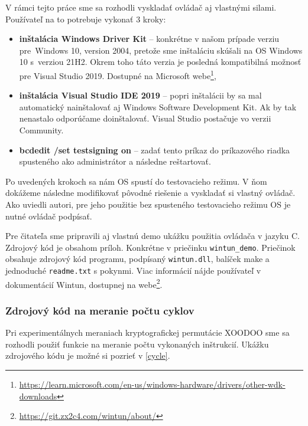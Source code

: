 V rámci tejto práce sme sa rozhodli vyskladať ovládač aj vlastnými silami. Používateľ na to potrebuje vykonať 3 kroky: 
\begin{itemize}
	\item\textbf{inštalácia Windows Driver Kit} -- konkrétne v našom prípade verziu pre~Windows 10, version 2004, pretože sme inštaláciu skúšali na OS Windows 10 s~verziou 21H2. Okrem toho táto verzia je posledná kompatibilná možnosť pre Visual Studio 2019. Dostupné na Microsoft webe\footnote{\url{https://learn.microsoft.com/en-us/windows-hardware/drivers/other-wdk-downloads}},
	\item\textbf{inštalácia Visual Studio IDE 2019} -- popri inštalácii by sa mal automatický nainštalovať aj Windows Software Development Kit. Ak by tak nenastalo odporúčame doinštalovať. Visual Studio postačuje vo verzii Community.  
	\item\textbf{bcdedit /set testsigning on} -- zadať tento príkaz do príkazového riadka spusteného ako administrátor a následne reštartovať. 
\end{itemize}  
Po uvedených krokoch sa nám OS spustí do testovacieho režimu. V ňom dokážeme následne modifikovať pôvodné riešenie a vyskladať si vlastný ovládač. Ako uviedli autori, pre jeho použitie bez spusteného testovacieho režimu OS je nutné ovládač podpísať. 

Pre čitateľa sme pripravili aj vlastnú demo ukážku použitia ovládača v jazyku C. Zdrojový kód je obsahom príloh. Konkrétne v priečinku \lstinline|wintun_demo|. Priečinok obsahuje zdrojový kód programu, podpísaný \lstinline|wintun.dll|, balíček make a jednoduché \lstinline|readme.txt| s pokynmi.
Viac informácií nájde používateľ v dokumentácií Wintun, dostupnej na webe\footnote{\url{https://git.zx2c4.com/wintun/about/}}.
   
\subsubsection{Zdrojový kód na meranie počtu cyklov} 
Pri experimentálnych meraniach kryptografickej permutácie XOODOO sme sa rozhodli použiť funkcie na meranie počtu vykonaných inštrukcií. Ukážku zdrojového kódu je možné si pozrieť v \ref{cycle}.

